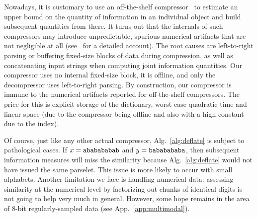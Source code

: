 Nowadays, it is customary to use an off-the-shelf compressor~\cite{cilibrasi:2005} to estimate an upper bound on the quantity of information in an individual object and build subsequent quantities from there. It turns out that the internals of such compressors may introduce unpredictable, spurious numerical artifacts that are not negligible at all (see~\cite{cebrian:2005} for a detailed account). The root causes are left-to-right parsing or buffering fixed-size blocks of data during compression, as well as concatenating input strings when computing joint information quantities. Our compressor uses no internal fixed-size block, it is offline, and only the decompressor uses left-to-right parsing. By construction, our compressor is immune to the numerical artifacts reported for off-the-shelf compressors. The price for this is explicit storage of the dictionary, worst-case quadratic-time and linear space (due to the compressor being offline and also with a high constant due to the index).

Of course, just like any other actual compressor, Alg.~\ref{alg:deflate} is subject to pathological cases. If $x=\mbox{\texttt{ababababab}}$ and $y=\mbox{\texttt{bababababa}}$, then subsequent information measures will miss the similarity because Alg.~\ref{alg:deflate} would not have issued the same parselet. This issue is more likely to occur with small alphabets. Another limitation we face is handling numerical data: assessing similarity at the numerical level by factorizing out chunks of identical digits is not going to help very much in general. However, some hope remains in the area of 8-bit regularly-sampled data (see App.~\ref{app:multimodal}).